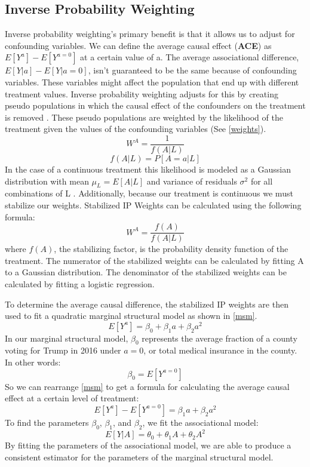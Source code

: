 \documentclass[11pt, conference,compsoc]{IEEEtran}
\begin{document}
\subsection{Inverse Probability Weighting}
Inverse probability weighting's primary benefit is that it allows us to adjust for confounding variables. We can define the average causal effect (\textbf{ACE}) as $E[Y^{a}]-E[Y^{a=0}]$ at a certain value of a. The average associational difference, $E[Y|a]- E[Y|a=0]$, isn't guaranteed to be the same because of confounding variables. These variables might affect the population that end up with different treatment values. Inverse probability weighting adjusts for this by creating pseudo populations in which the causal effect of the confounders on the treatment is removed \cite{hernan}. These pseudo populations are weighted by the likelihood of the treatment given the values of the confounding variables (See \ref{weights}).
\begin{equation}
\label{weights}
W^A = \frac{1}{f(A|L)}
\end{equation} 
\begin{equation}
f(A|L) = P[A=a|L]
\end{equation}
In the case of a continuous treatment this likelihood is modeled as a Gaussian distribution with mean $\mu_L = E[A|L]$ and variance of residuals $\sigma^2$ for all combinations of L \cite{hernan}. Additionally, because our treatment is continuous we must stabilize our weights. Stabilized IP Weights can be calculated using the following formula:
\begin{equation}
W^A = \frac{f(A)}{f(A|L)}
\end{equation}
where $f(A)$, the stabilizing factor, is the probability density function of the treatment. The numerator of the stabilized weights can be calculated by fitting A to a Gaussian distribution. The denominator of the stabilized weights can be calculated by fitting a logistic regression.

To determine the average causal difference, the stabilized IP weights are then used to fit a quadratic marginal structural model as shown in \ref{msm}.
\begin{equation}
\label{msm}
E[Y^{a}] = \beta_0 + \beta_1a + \beta_2a^2
\end{equation}
In our marginal structural model, $\beta_0$ represents the average fraction of a county voting for Trump in 2016 under $a = 0$, or total medical insurance in the county. In other words:
\begin{equation}
\beta_0 = E[Y^{a=0}]
\end{equation}
So we can rearrange \ref{msm} to get a formula for calculating the average causal effect at a certain level of treatment:
\begin{equation}
\label{msmACE}
E[Y^a]-E[Y^{a=0}] = \beta_1a + \beta_2a^2
\end{equation}
To find the parameters $\beta_0$, $\beta_1$, and $\beta_2$, we fit the associational model:
\begin{equation}
E[Y|A] = \theta_0 + \theta_1A + \theta_2A^2
\end{equation}
By fitting the parameters of the associational model, we are able to produce a consistent estimator for the parameters of the marginal structural model.
\end{document}
